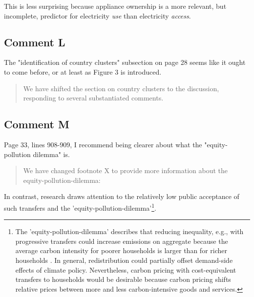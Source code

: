\documentclass[11pt]{article}
\newenvironment{response}
{\begin{quote}\color{black}}
{\end{quote}}
\begin{document}
\begin{revisionbox}
   This is less surprising because appliance ownership is a more relevant, but incomplete, predictor for electricity \textit{use} than electricity \textit{access}.
\end{revisionbox}


\subsection*{Comment L}\label{comment_R1_L}

\begin{commentbox}
    The "identification of country clusters" subsection on page 28 seems like it ought to come before, or at least as Figure 3 is introduced.
\end{commentbox}

\begin{response}
    We have shifted the section on country clusters to the discussion, responding to several substantiated comments.
\end{response}

\subsection*{Comment M}\label{comment_R1_M}

\begin{commentbox}
    Page 33, lines 908-909, I recommend being clearer about what the "equity-pollution dilemma" is.
\end{commentbox}

\begin{response}
    We have changed footnote X to provide more information about the equity-pollution-dilemma:
\end{response}

\begin{revisionbox}
    In contrast, research draws attention to the relatively low public acceptance of such transfers and the 'equity-pollution-dilemma'\footnote{The 'equity-pollution-dilemma' describes that reducing inequality, e.g., with progressive transfers could increase emissions on aggregate because the average carbon intensity for poorer households is larger than for richer households \autocite[see also][]{Stiglitz.2019}. In general, redistribution could partially offset demand-side effects of climate policy. Nevertheless, carbon pricing with cost-equivalent transfers to households would be desirable because carbon pricing shifts relative prices between more and less carbon-intensive goods and services.}\autocite{Sager.2019}.
\end{revisionbox}
\end{document}
